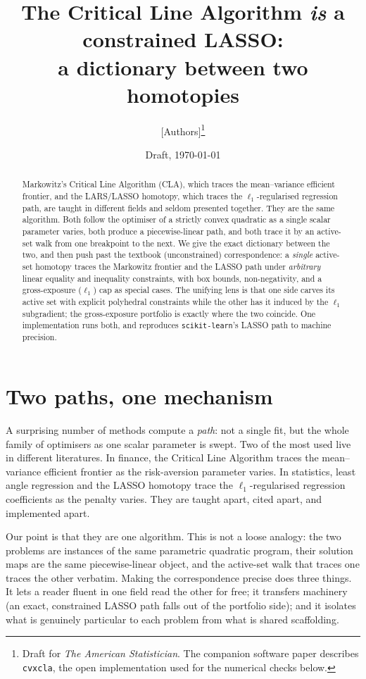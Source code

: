 \documentclass[11pt]{article}
\title{The Critical Line Algorithm \emph{is} a constrained LASSO:\\
a dictionary between two homotopies}
\author{%
  [Authors]\thanks{Draft for \emph{The American Statistician}. The companion
  software paper describes \texttt{cvxcla}, the open implementation used for the
  numerical checks below.}%
}
\date{Draft, \today}
\begin{document}
\maketitle

\begin{abstract}
Markowitz's Critical Line Algorithm (CLA), which traces the mean--variance
efficient frontier, and the LARS/LASSO homotopy, which traces the
$\ell_1$-regularised regression path, are taught in different fields and seldom
presented together. They are the same algorithm. Both follow the optimiser of a
strictly convex quadratic as a single scalar parameter varies, both produce a
piecewise-linear path, and both trace it by an active-set walk from one breakpoint
to the next. We give the exact dictionary between the two, and then push past the
textbook (unconstrained) correspondence: a \emph{single} active-set homotopy traces
the Markowitz frontier and the LASSO path under \emph{arbitrary} linear equality and
inequality constraints, with box bounds, non-negativity, and a gross-exposure
($\ell_1$) cap as special cases. The unifying lens is that one side carves its
active set with explicit polyhedral constraints while the other has it induced by
the $\ell_1$ subgradient; the gross-exposure portfolio is exactly where the two
coincide. One implementation runs both, and reproduces \texttt{scikit-learn}'s LASSO
path to machine precision.
\end{abstract}

\section{Two paths, one mechanism}

A surprising number of methods compute a \emph{path}: not a single fit, but the
whole family of optimisers as one scalar parameter is swept. Two of the most used
live in different literatures. In finance, the Critical Line Algorithm
\citep{markowitz1956, markowitz1959} traces the mean--variance efficient frontier as
the risk-aversion parameter varies. In statistics, least angle regression and the
LASSO homotopy \citep{tibshirani1996, osborne2000, efron2004} trace the
$\ell_1$-regularised regression coefficients as the penalty varies. They are taught
apart, cited apart, and implemented apart.

Our point is that they are one algorithm. This is not a loose analogy: the two
problems are instances of the same parametric quadratic program, their solution
maps are the same piecewise-linear object, and the active-set walk that traces one
traces the other verbatim. Making the correspondence precise does three things. It
lets a reader fluent in one field read the other for free; it transfers
machinery (an exact, constrained LASSO path falls out of the portfolio side); and
it isolates what is genuinely particular to each problem from what is shared
scaffolding.
\end{document}

